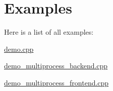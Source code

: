\section{Examples}
Here is a list of all examples\+:\begin{DoxyCompactItemize}
\item 
\hyperlink{demo_8cpp-example}{demo.\+cpp}
\item 
\hyperlink{demo_multiprocess_backend_8cpp-example}{demo\+\_\+multiprocess\+\_\+backend.\+cpp}
\item 
\hyperlink{demo_multiprocess_frontend_8cpp-example}{demo\+\_\+multiprocess\+\_\+frontend.\+cpp}
\end{DoxyCompactItemize}
